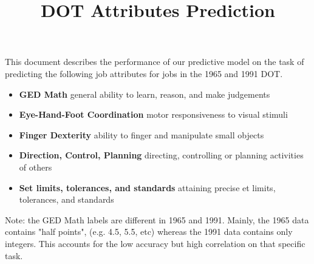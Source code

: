 \documentclass[11pt]{article}
\title{DOT Attributes Prediction}
\begin{document}
\maketitle

This document describes the performance of our predictive model on the task of predicting the following job attributes for jobs in the 1965 and 1991 DOT.

\begin{itemize}
  \item \textbf{GED Math} general ability to learn, reason, and make judgements
  \item \textbf{Eye-Hand-Foot Coordination} motor responsiveness to visual stimuli
  \item \textbf{Finger Dexterity} ability to finger and manipulate small objects
  \item \textbf{Direction, Control, Planning} directing, controlling or planning activities of others
  \item \textbf{Set limits, tolerances, and standards} attaining precise et limits, tolerances, and standards
\end{itemize}

Note: the GED Math labels are different in 1965 and 1991. Mainly, the 1965 data contains "half points", (e.g. 4.5, 5.5, etc) whereas the 1991 data contains only integers. This accounts for the low accuracy but high correlation on that specific task.  
\end{document}
